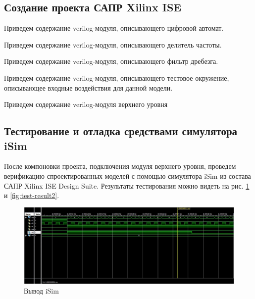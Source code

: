 \documentclass[a4paper,14pt]{extarticle}
\begin{document}
\subsection{Создание проекта САПР Xilinx ISE}
Приведем содержание verilog-модуля, описывающего цифровой автомат.


Приведем содержание verilog-модуля, описывающего делитель частоты.

\newpage

Приведем содержание verilog-модуля, описывающего фильтр дребезга. 

Приведем содержание verilog-модуля, описывающего тестовое окружение, описывающее входные воздействия для данной модели. 

Приведем содержание verilog-модуля верхнего уровня 




\subsection{Тестирование и отладка средствами симулятора iSim}
После компоновки проекта, подключения модуля верхнего уровня, проведем верификацию спроектированных моделей с помощью симулятора iSim из состава САПР Xilinx ISE Design Suite. Результаты тестирования можно видеть на рис. \ref{fig:test-result1} и \ref{fig:test-result2}.

\begin{figure}[htpb]
	\centering
	\includegraphics[width=\linewidth]{images/test-result2.1}
	\caption{Вывод iSim }
	\label{fig:test-result1}
\end{figure}
\end{document}
